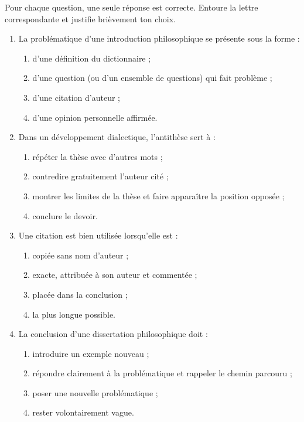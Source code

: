\documentclass[11pt]{article}
\begin{document}
\begin{exercice}
Pour chaque question, une seule réponse est correcte. Entoure la lettre correspondante et justifie brièvement ton choix.
\begin{enumerate}
\item La problématique d'une introduction philosophique se présente sous la forme :
\begin{enumerate}
\item d'une définition du dictionnaire ;
\item d'une question (ou d'un ensemble de questions) qui fait problème ;
\item d'une citation d'auteur ;
\item d'une opinion personnelle affirmée.
\end{enumerate}
\item Dans un développement dialectique, l'antithèse sert à :
\begin{enumerate}
\item répéter la thèse avec d'autres mots ;
\item contredire gratuitement l'auteur cité ;
\item montrer les limites de la thèse et faire apparaître la position opposée ;
\item conclure le devoir.
\end{enumerate}
\item Une citation est bien utilisée lorsqu'elle est :
\begin{enumerate}
\item copiée sans nom d'auteur ;
\item exacte, attribuée à son auteur et commentée ;
\item placée dans la conclusion ;
\item la plus longue possible.
\end{enumerate}
\item La conclusion d'une dissertation philosophique doit :
\begin{enumerate}
\item introduire un exemple nouveau ;
\item répondre clairement à la problématique et rappeler le chemin parcouru ;
\item poser une nouvelle problématique ;
\item rester volontairement vague.
\end{enumerate}
\end{enumerate}
\end{exercice}
\end{document}
